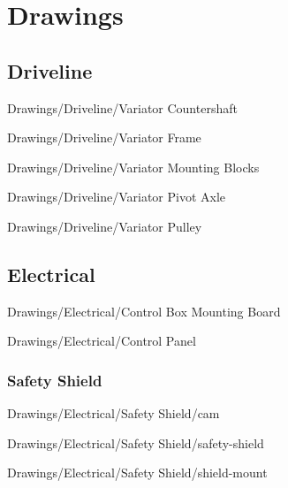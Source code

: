 \chapter{Drawings}

\section{Driveline}


{Drawings/Driveline/Variator Countershaft}


{Drawings/Driveline/Variator Frame}


{Drawings/Driveline/Variator Mounting Blocks}


{Drawings/Driveline/Variator Pivot Axle}


{Drawings/Driveline/Variator Pulley}

\section{Electrical}


{Drawings/Electrical/Control Box Mounting Board}


{Drawings/Electrical/Control Panel}

\subsection{Safety Shield}


{Drawings/Electrical/Safety Shield/cam}


{Drawings/Electrical/Safety Shield/safety-shield}


{Drawings/Electrical/Safety Shield/shield-mount}

